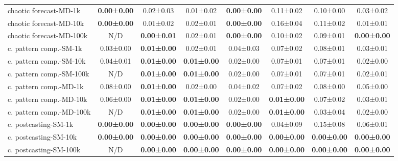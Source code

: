 \documentclass{article}
\begin{document}
\begin{table}[H]
{\begin{tabular}{lccccccc}
    chaotic forecast-MD-1k              & \textbf{0.00±0.00}  & 0.02±0.03      & 0.01±0.02      & \textbf{0.00±0.00}  & 0.11±0.02            & 0.10±0.00           & 0.03±0.02      \\
    chaotic forecast-MD-10k             & \textbf{0.00±0.00}  & 0.01±0.02      & 0.02±0.01      & \textbf{0.00±0.00}  & 0.16±0.04            & 0.11±0.02           & 0.01±0.01      \\
    chaotic forecast-MD-100k            & N/D              & \textbf{0.00±0.01}  & 0.02±0.01      & \textbf{0.00±0.00}  & 0.10±0.02            & 0.09±0.01           & \textbf{0.00±0.00}  \\
    c. pattern comp.-SM-1k    & 0.03±0.00      & \textbf{0.01±0.00}  & 0.02±0.01      & 0.04±0.03      & 0.07±0.02            & 0.08±0.01           & 0.03±0.01      \\
    c. pattern comp.-SM-10k   & 0.04±0.01      & \textbf{0.01±0.00}  & \textbf{0.01±0.00}  & 0.02±0.00      & 0.07±0.01            & 0.07±0.01           & 0.02±0.00      \\
    c. pattern comp.-SM-100k  & N/D              & \textbf{0.01±0.00}  & \textbf{0.01±0.00}  & 0.02±0.00      & 0.07±0.01            & 0.07±0.01           & 0.02±0.01      \\
    c. pattern comp.-MD-1k    & 0.08±0.00      & \textbf{0.01±0.00}  & 0.02±0.00      & 0.04±0.02      & 0.07±0.02            & 0.08±0.00           & 0.05±0.00      \\
    c. pattern comp.-MD-10k   & 0.06±0.00      & \textbf{0.01±0.00}  & \textbf{0.01±0.00}  & 0.02±0.00      & \textbf{0.01±0.00}        & 0.07±0.02           & 0.03±0.01      \\
    c. pattern comp.-MD-100k  & N/D              & \textbf{0.01±0.00}  & \textbf{0.01±0.00}  & 0.02±0.00      & \textbf{0.01±0.00}        & 0.03±0.04           & 0.02±0.00      \\
    c. postcasting-SM-1k           & \textbf{0.00±0.00}  & \textbf{0.00±0.00}  & \textbf{0.00±0.00}  & \textbf{0.00±0.00}  & 0.04±0.09            & 0.15±0.08           & 0.06±0.01      \\
    c. postcasting-SM-10k          & \textbf{0.00±0.00}  & \textbf{0.00±0.00}  & \textbf{0.00±0.00}  & \textbf{0.00±0.00}  & \textbf{0.00±0.00}        & \textbf{0.00±0.00}       & \textbf{0.00±0.00}  \\
    c. postcasting-SM-100k         & N/D              & \textbf{0.00±0.00}  & \textbf{0.00±0.00}  & \textbf{0.00±0.00}  & \textbf{0.00±0.00}        & \textbf{0.00±0.00}       & \textbf{0.00±0.00}  \\

\end{tabular}}
\end{table}
\end{document}
